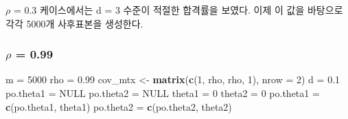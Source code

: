\documentclass[
]{article}
\newenvironment{Shaded}{\begin{snugshade}}{\end{snugshade}}
\newcommand{\AttributeTok}[1]{\textcolor[rgb]{0.13,0.29,0.53}{#1}}
\newcommand{\ConstantTok}[1]{\textcolor[rgb]{0.56,0.35,0.01}{#1}}
\newcommand{\DecValTok}[1]{\textcolor[rgb]{0.00,0.00,0.81}{#1}}
\newcommand{\FloatTok}[1]{\textcolor[rgb]{0.00,0.00,0.81}{#1}}
\newcommand{\FunctionTok}[1]{\textcolor[rgb]{0.13,0.29,0.53}{\textbf{#1}}}
\newcommand{\NormalTok}[1]{#1}
\newcommand{\OtherTok}[1]{\textcolor[rgb]{0.56,0.35,0.01}{#1}}
\begin{document}
\(\rho\) = 0.3 케이스에서는 d = 3 수준이 적절한 합격률을 보였다. 이제 이
값을 바탕으로 각각 5000개 사후표본을 생성한다.

\subsubsection{\texorpdfstring{\(\rho\) =
0.99}{\textbackslash rho = 0.99}}\label{rho-0.99-1}

\begin{Shaded}
\begin{Highlighting}[]
\NormalTok{m }\OtherTok{=} \DecValTok{5000}
\NormalTok{rho }\OtherTok{=} \FloatTok{0.99}
\NormalTok{cov\_mtx }\OtherTok{\textless{}{-}} \FunctionTok{matrix}\NormalTok{(}\FunctionTok{c}\NormalTok{(}\DecValTok{1}\NormalTok{, rho, rho, }\DecValTok{1}\NormalTok{), }\AttributeTok{nrow =} \DecValTok{2}\NormalTok{)}
\NormalTok{d }\OtherTok{=} \FloatTok{0.1}
\NormalTok{po.theta1 }\OtherTok{=} \ConstantTok{NULL}
\NormalTok{po.theta2 }\OtherTok{=} \ConstantTok{NULL}
\NormalTok{theta1 }\OtherTok{=} \DecValTok{0}
\NormalTok{theta2 }\OtherTok{=} \DecValTok{0}
\NormalTok{po.theta1 }\OtherTok{=} \FunctionTok{c}\NormalTok{(po.theta1, theta1)}
\NormalTok{po.theta2 }\OtherTok{=} \FunctionTok{c}\NormalTok{(po.theta2, theta2) }


\end{Highlighting}
\end{Shaded}
\end{document}
